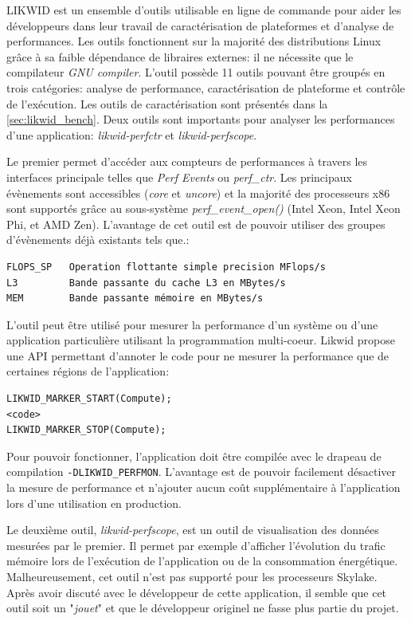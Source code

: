             LIKWID est un ensemble d'outils utilisable en ligne de commande pour aider les développeurs dans leur travail de caractérisation de plateformes et d'analyse de performances. Les outils fonctionnent sur la majorité des distributions Linux grâce à sa faible dépendance de libraires externes: il ne nécessite que le compilateur \textit{GNU compiler}. L'outil possède 11 outils pouvant être groupés en trois catégories: analyse de performance, caractérisation de plateforme et contrôle de l'exécution. Les outils de caractérisation sont présentés dans la \autoref{sec:likwid_bench}. Deux outils sont importants pour analyser les performances d'une application: \textit{likwid-perfctr} et \textit{likwid-perfscope}.
        
            Le premier permet d'accéder aux compteurs de performances à travers les interfaces principale telles que \textit{Perf Events} ou \textit{perf\_ctr}. Les principaux évènements sont accessibles (\textit{core} et \textit{uncore}) et la majorité des processeurs x86 sont supportés grâce au sous-système \textit{perf\_event\_open()} (Intel Xeon, Intel Xeon Phi, et AMD Zen). L'avantage de cet outil est de pouvoir utiliser des groupes d'évènements déjà existants tels que.:
\begin{lstlisting}
FLOPS_SP   Operation flottante simple precision MFlops/s
L3         Bande passante du cache L3 en MBytes/s
MEM        Bande passante mémoire en MBytes/s
\end{lstlisting}
            L'outil peut être utilisé pour mesurer la performance d'un système ou d'une application particulière utilisant la programmation multi-coeur. 
        Likwid propose une API permettant d'annoter le code pour ne mesurer la performance que de certaines régions de l'application:
\begin{lstlisting}
LIKWID_MARKER_START(Compute);
<code>
LIKWID_MARKER_STOP(Compute);
\end{lstlisting}
            Pour pouvoir fonctionner, l'application doit être compilée avec le drapeau de compilation \verb|-DLIKWID_PERFMON|. L'avantage est de pouvoir facilement désactiver la mesure de performance et n'ajouter aucun coût supplémentaire à l'application lors d'une utilisation en production.
        
        
            Le deuxième outil, \textit{likwid-perfscope}, est un outil de visualisation des données mesurées par le premier. Il permet par exemple d'afficher l'évolution du trafic mémoire lors de l'exécution de l'application ou de la consommation énergétique. Malheureusement, cet outil n'est pas supporté pour les processeurs Skylake. Après avoir discuté avec le développeur de cette application, il semble que cet outil soit un "\textit{jouet}" et que le développeur originel ne fasse plus partie du projet.  
            
